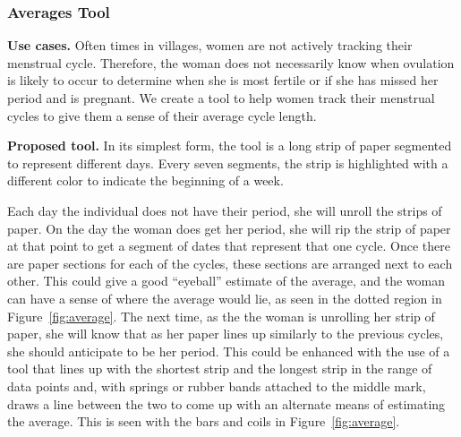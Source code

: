 \documentclass{sig-alternate}
\begin{document}

\subsubsection{Averages Tool}
\label{sec:average}

\textbf{Use cases.} 
Often times in villages, women are not actively tracking their menstrual cycle. Therefore, the woman does not necessarily know when ovulation is likely to occur to determine when she is most fertile or if she has missed her period and is pregnant. We create a tool to help women track their menstrual cycles to give them a sense of their average cycle length.

\textbf{Proposed tool.}
In its simplest form, the tool is a long strip of paper segmented to represent different days. Every seven segments, the strip is highlighted with a different color to indicate the beginning of a week.

Each day the individual does not have their period, she will unroll the strips of paper. 
On the day the woman does get her period, she will rip the strip of paper at that point to get a segment of dates that represent that one cycle. Once there are paper sections for each of the cycles, these sections are arranged next to each other. This could give a good ``eyeball'' estimate of the average, and the woman can have a sense of where the average would lie, as seen in the dotted region in Figure~\ref{fig:average}. The next time, as the the woman is unrolling her strip of paper, she will know that as her paper lines up similarly to the previous cycles, she should anticipate to be her period. This could be enhanced with the use of a tool that lines up with the shortest strip and the longest strip in the range of data points and, with springs or rubber bands attached to the middle mark, draws a line between the two to come up with an alternate means of estimating the average. This is seen with the bars and coils in Figure~\ref{fig:average}.
\end{document}

